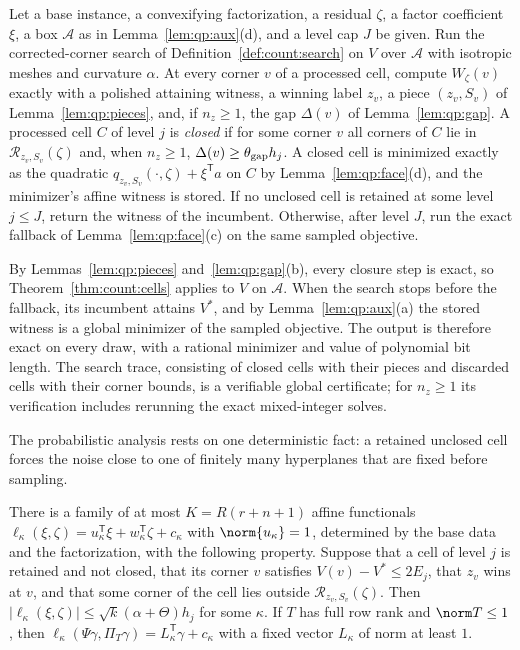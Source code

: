 \begin{definition}\label{def:qp:closure-search}
Let a base instance, a convexifying factorization, a residual $\zeta$, a
factor coefficient $\xi$, a box $\mathcal A$ as in Lemma~\ref{lem:qp:aux}(d),
and a level cap $J$ be given. Run the corrected-corner search of
Definition~\ref{def:count:search} on $V$ over $\mathcal A$ with isotropic
meshes and curvature $\alpha$. At every corner $v$ of a processed cell,
compute $W_\zeta(v)$ exactly with a polished attaining witness, a winning
label $z_v$, a piece $(z_v,S_v)$ of Lemma~\ref{lem:qp:pieces}, and, if
$n_z\ge1$, the gap $\Delta(v)$ of Lemma~\ref{lem:qp:gap}. A processed cell
$C$ of level $j$ is \emph{closed} if for some corner $v$ all corners of $C$
lie in $\mathcal R_{z_v,S_v}(\zeta)$ and, when $n_z\ge1$,
$\Delta(v)\ge\theta_{\rm gap}h_j$. A closed cell is minimized exactly as the
quadratic $q_{z_v,S_v}(\cdot,\zeta)+\xi^{\mathsf T} a$ on $C$ by
Lemma~\ref{lem:qp:face}(d), and the minimizer's affine witness is stored. If
no unclosed cell is retained at some level $j\le J$, return the witness of the
incumbent. Otherwise, after level $J$, run the exact fallback of
Lemma~\ref{lem:qp:face}(c) on the same sampled objective.
\end{definition}

By Lemmas~\ref{lem:qp:pieces} and~\ref{lem:qp:gap}(b), every closure step is
exact, so Theorem~\ref{thm:count:cells} applies to $V$ on $\mathcal A$. When
the search stops before the fallback, its incumbent attains $V^*$, and by
Lemma~\ref{lem:qp:aux}(a) the stored witness is a global minimizer of the
sampled objective. The output is therefore exact on every draw, with a
rational minimizer and value of polynomial bit length. The search trace,
consisting of closed cells with their pieces and discarded cells with their
corner bounds, is a verifiable global certificate; for $n_z\ge1$ its
verification includes rerunning the exact mixed-integer solves.

The probabilistic analysis rests on one deterministic fact: a retained
unclosed cell forces the noise close to one of finitely many hyperplanes that
are fixed before sampling.

\begin{lemma}\label{lem:qp:tube}
There is a family of at most $K=R(r+n+1)$ affine functionals
$\ell_\kappa(\xi,\zeta)=u_\kappa^{\mathsf T}\xi+w_\kappa^{\mathsf T}\zeta+c_\kappa$ with
$\norm{u_\kappa}=1$, determined by the base data and the factorization, with
the following property. Suppose that a cell of level $j$ is retained and not
closed, that its corner $v$ satisfies $V(v)-V^*\le2E_j$, that $z_v$ wins at
$v$, and that some corner of the cell lies outside
$\mathcal R_{z_v,S_v}(\zeta)$. Then
$|\ell_\kappa(\xi,\zeta)|\le\sqrt k(\alpha+\Theta)h_j$ for some $\kappa$. If
$T$ has full row rank and $\norm T\le1$, then
$\ell_\kappa(\Psi\gamma,\Pi_T\gamma)=L_\kappa^{\mathsf T}\gamma+c_\kappa$ with a
fixed vector $L_\kappa$ of norm at least $1$.
\end{lemma}

